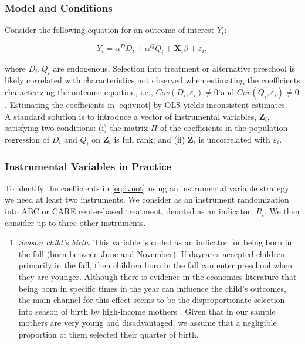 \begin{appendices}
\subsubsection{Model and Conditions}

\noindent Consider the following equation for an outcome of interest $Y_{i}$:


\begin{equation}
Y_i = \alpha^D D_i + \alpha^Q Q_i + \mathbf{X}_i \beta + \varepsilon_i,
\label{eq:ivnot}
\end{equation}

\noindent where $D_{i}, Q_{i}$ are endogenous. Selection into treatment or alternative preschool is likely correlated with characteristics not observed when estimating the coefficients characterizing the outcome equation, i.e., $Cov(D_i,\varepsilon_i) \neq 0$ and $Cov(Q_i,\varepsilon_i) \neq 0$. Estimating the coefficients in \eqref{eq:ivnot} by OLS yields inconsistent estimates.\\

\noindent A standard solution is to introduce a vector of instrumental variables, $\mathbf{Z}_i$, satisfying two conditions: (i) the matrix $\Pi$ of the coefficients in the population regression of $D_i$ and $Q_i$ on $\mathbf{Z}_i$ is full rank; and (ii) $\mathbf{Z}_i$ is uncorrelated with $\varepsilon_i$.


\subsubsection{Instrumental Variables in Practice}

\noindent To identify the coefficients in \eqref{eq:ivnot} using an instrumental variable strategy we need at least two instruments. We consider as an instrument randomization into ABC or CARE center-based treatment, denoted as an indicator, $R_{i}$. We then consider up to three other instruments.

\begin{enumerate}
\item \textit{Season child's birth}. This variable is coded as an indicator for being born in the fall (born between June and November). If daycares accepted children primarily in the fall, then children born in the fall can enter preschool when they are younger. Although there is evidence in the economics literature that being born in specific times in the year can influence the child's outcomes, the main channel for this effect seems to be the disproportionate selection into season of birth by high-income mothers \citep{Buckles-Hungerman_2013_RES}. Given that in our sample mothers are very young and disadvantaged, we assume that a negligible proportion of them selected their quarter of birth.


\end{enumerate}
\end{appendices}
